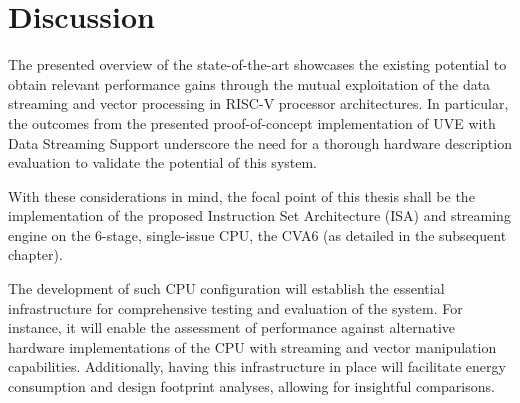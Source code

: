 \section{Discussion}
The presented overview of the state-of-the-art showcases the existing potential to obtain relevant performance gains through the mutual exploitation of the data streaming and vector processing in RISC-V processor architectures. In particular, the outcomes from the presented proof-of-concept implementation of UVE with Data Streaming Support underscore the need for a thorough hardware description evaluation to validate the potential of this system.

With these considerations in mind, the focal point of this thesis shall be the implementation of the proposed Instruction Set Architecture (ISA) and streaming engine on the 6-stage, single-issue CPU, the CVA6 (as detailed in the subsequent chapter).

The development of such CPU configuration will establish the essential infrastructure for comprehensive testing and evaluation of the system. For instance, it will enable the assessment of performance against alternative hardware implementations of the CPU with streaming and vector manipulation capabilities. Additionally, having this infrastructure in place will facilitate energy consumption and design footprint analyses, allowing for insightful comparisons.






